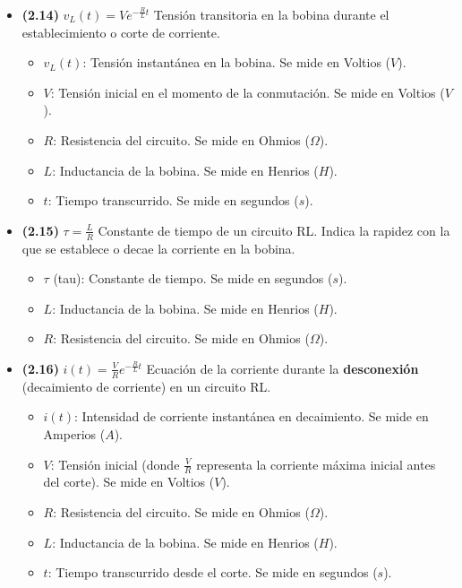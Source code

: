 \documentclass{article}
\begin{document}
\begin{itemize}
				\item \textbf{(2.14)} $\boxed{v_L(t)=Ve^{-\frac{R}{L}t}}$ Tensión transitoria en la bobina durante el establecimiento o corte de corriente.
					\begin{itemize}
						\item $v_L(t)$: Tensión instantánea en la bobina. Se mide en Voltios ($V$).
						\item $V$: Tensión inicial en el momento de la conmutación. Se mide en Voltios ($V$).
						\item $R$: Resistencia del circuito. Se mide en Ohmios ($\Omega$).
						\item $L$: Inductancia de la bobina. Se mide en Henrios ($H$).
						\item $t$: Tiempo transcurrido. Se mide en segundos ($s$).
					\end{itemize}

				\item \textbf{(2.15)} $\boxed{\tau=\frac{L}{R}}$ Constante de tiempo de un circuito RL. Indica la rapidez con la que se establece o decae la corriente en la bobina.
				\begin{itemize}
					\item $\tau$ (tau): Constante de tiempo. Se mide en segundos ($s$).
					\item $L$: Inductancia de la bobina. Se mide en Henrios ($H$).
					\item $R$: Resistencia del circuito. Se mide en Ohmios ($\Omega$).
				\end{itemize}

				\item \textbf{(2.16)} $\boxed{i(t)=\frac{V}{R}e^{-\frac{R}{L}t}}$ Ecuación de la corriente durante la \textbf{desconexión} (decaimiento de corriente) en un circuito RL.
				\begin{itemize}
					\item $i(t)$: Intensidad de corriente instantánea en decaimiento. Se mide en Amperios ($A$).
					\item $V$: Tensión inicial (donde $\frac{V}{R}$ representa la corriente máxima inicial antes del corte). Se mide en Voltios ($V$).
					\item $R$: Resistencia del circuito. Se mide en Ohmios ($\Omega$).
					\item $L$: Inductancia de la bobina. Se mide en Henrios ($H$).
					\item $t$: Tiempo transcurrido desde el corte. Se mide en segundos ($s$).
				\end{itemize}
			\end{itemize}
\end{document}
